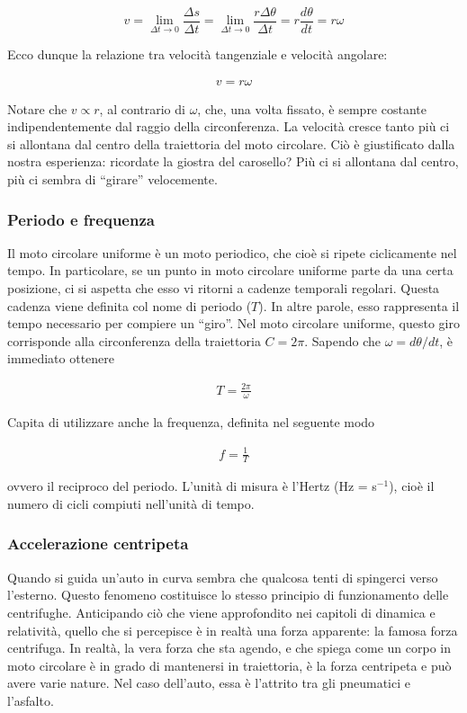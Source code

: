 \[ v = \lim_{\Delta t \to 0}\frac{\Delta s}{\Delta t} = \lim_{\Delta t \to 0}\frac{r \Delta\theta}{\Delta t} = r\frac{d\theta}{dt} = r\omega \]

\noindent Ecco dunque la relazione tra velocità tangenziale e velocità
angolare:

\begin{align}
    v = r \omega
\end{align}

\noindent Notare che $v \propto r$, al contrario di $\omega$, che, una volta
fissato, è sempre costante indipendentemente dal raggio della circonferenza.
La velocità cresce tanto più ci si allontana dal centro della traiettoria
del moto circolare. Ciò è giustificato dalla nostra esperienza: ricordate
la giostra del carosello? Più ci si allontana dal centro, più ci sembra di
``girare'' velocemente.

\subsubsection*{Periodo e frequenza}
Il moto circolare uniforme è un moto periodico, che cioè si ripete
ciclicamente nel tempo. In particolare, se un punto in moto circolare
uniforme parte da una certa posizione, ci si aspetta che esso vi ritorni
a cadenze temporali regolari. Questa cadenza viene definita col nome di periodo
($T$). In altre parole, esso rappresenta il tempo necessario per compiere
un ``giro''. Nel moto circolare uniforme, questo giro corrisponde alla
circonferenza della traiettoria $C = 2\pi$. Sapendo che $\omega = d\theta/dt$,
è immediato ottenere

\begin{align}
    T = \frac{2\pi}{\omega}
\end{align}

\noindent Capita di utilizzare anche la frequenza, definita nel seguente
modo

\begin{align}
    f = \frac{1}{T}
\end{align}

\noindent ovvero il reciproco del periodo. L'unità di misura è l'Hertz
(Hz = s$^{-1}$), cioè il numero di cicli compiuti nell'unità di tempo.

\subsubsection*{Accelerazione centripeta}
Quando si guida un'auto in curva sembra che qualcosa tenti di spingerci
verso l'esterno. Questo fenomeno costituisce lo stesso principio di
funzionamento delle centrifughe. Anticipando ciò che viene approfondito
nei capitoli di dinamica e relatività, quello che si percepisce è in
realtà una forza apparente: la famosa forza centrifuga. In realtà,
la vera forza che sta agendo, e che spiega come un corpo in moto circolare
è in grado di mantenersi in traiettoria, è la forza centripeta e può
avere varie nature. Nel caso dell'auto, essa è l'attrito tra gli pneumatici
e l'asfalto.

